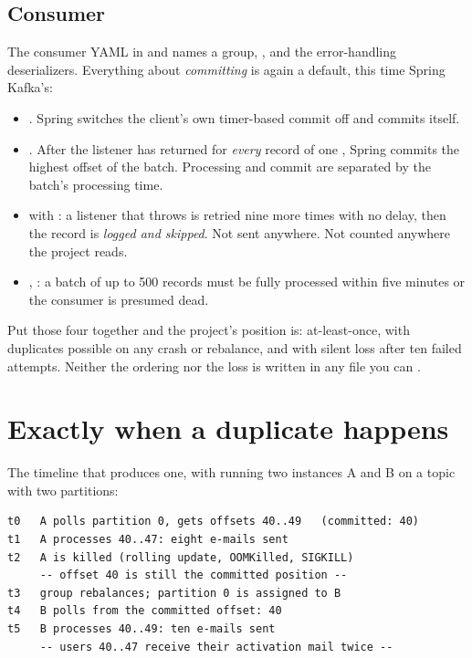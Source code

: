 \subsection{Consumer}

The consumer YAML in  and
 names a group, , and the error-handling deserializers. Everything about
\emph{committing} is again a default, this time Spring Kafka's:

\begin{itemize}
  \item {}. Spring switches the client's
  own timer-based commit off and commits itself.
  \item {}. After the listener has returned for
  \emph{every} record of one , Spring commits the highest
  offset of the batch. Processing and commit are separated by the
  batch's processing time.
  \item {} with : a
  listener that throws is retried nine more times with no delay, then
  the record is \emph{logged and skipped}. Not sent anywhere. Not
  counted anywhere the project reads.
  \item {}, :
  a batch of up to 500 records must be fully processed within five
  minutes or the consumer is presumed dead.
\end{itemize}

Put those four together and the project's position is: at-least-once,
with duplicates possible on any crash or rebalance, and with silent loss
after ten failed attempts. Neither the ordering nor the loss is written
in any file you can .

\section{Exactly when a duplicate happens}

The timeline that produces one, with  running
two instances A and B on a topic with two partitions:

\begin{lstlisting}
t0   A polls partition 0, gets offsets 40..49   (committed: 40)
t1   A processes 40..47: eight e-mails sent
t2   A is killed (rolling update, OOMKilled, SIGKILL)
     -- offset 40 is still the committed position --
t3   group rebalances; partition 0 is assigned to B
t4   B polls from the committed offset: 40
t5   B processes 40..49: ten e-mails sent
     -- users 40..47 receive their activation mail twice --
\end{lstlisting}

